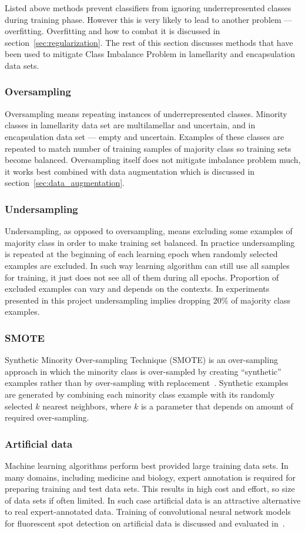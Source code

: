 \documentclass[a4paper, 11pt, table]{article}
\begin{document}
Listed above methods prevent classifiers from ignoring underrepresented classes during training phase. However this is very likely to lead to another problem --- overfitting. Overfitting and how to combat it is discussed in section~\ref{sec:regularization}. The rest of this section discusses methods that have been used to mitigate Class Imbalance Problem in lamellarity and encapsulation data sets. 


\subsubsection{Oversampling}
Oversampling means repeating instances of underrepresented classes. Minority classes in lamellarity data set are multilamellar and uncertain, and in encapsulation data set --- empty and uncertain. Examples of these classes are repeated to match number of training samples of majority class so training sets become balanced. Oversampling itself does not mitigate imbalance problem much, it works best combined with data augmentation which is discussed in section~\ref{sec:data_augmentation}.

\subsubsection{Undersampling}
Undersampling, as opposed to oversampling, means excluding some examples of majority class in order to make training set balanced. In practice undersampling is repeated at the beginning of each learning epoch when randomly selected examples are excluded. In such way learning algorithm can still use all samples for training, it just does not see all of them during all epochs. Proportion of excluded examples can vary and depends on the contexts. In experiments presented in this project undersampling implies dropping $20\%$ of majority class examples. 

\subsubsection{SMOTE}
Synthetic Minority Over-sampling Technique (SMOTE) is an over-sampling approach in which the minority class is over-sampled by creating “synthetic” examples rather than by over-sampling with replacement~\cite{smote_chawla}. 
Synthetic examples are generated by combining each minority class example with its randomly selected $k$ nearest neighbors, where $k$ is a parameter that depends on amount of required over-sampling.

\subsubsection{Artificial data}
Machine learning algorithms perform best provided large training data sets. In many domains, including medicine and biology, expert annotation is required for preparing training and test data sets. This results in high cost and effort, so size of data sets if often limited. In such case artificial data is an attractive alternative to real expert-annotated data. Training of convolutional neural network models for fluorescent spot detection on artificial data is discussed and evaluated in~\cite{ishaq_synthetic}. 
\end{document}
